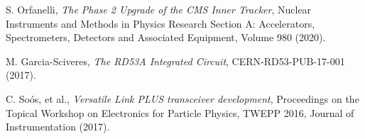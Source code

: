 \documentclass[a4paper,11pt]{article}
\begin{document}
\begin{thebibliography}{99}
S. Orfanelli, \emph{The Phase 2 Upgrade of the CMS Inner Tracker},
Nuclear Instruments and Methods in Physics Research Section A: Accelerators, Spectrometers, Detectors and Associated Equipment, Volume 980 (2020).

%

M. Garcia-Sciveres, \emph{The RD53A Integrated Circuit},
CERN-RD53-PUB-17-001 (2017).

%

C. So{\'{o}}s, et al., \emph{Versatile Link {PLUS} transceiver development},
Proceedings on the Topical Workshop on Electronics for Particle Physics, TWEPP 2016,
Journal of Instrumentation (2017).



\end{thebibliography}
\end{document}
